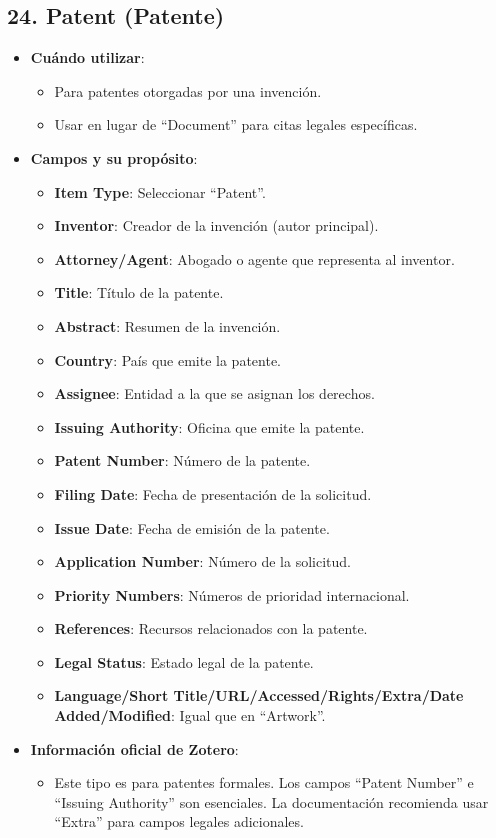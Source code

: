 \documentclass[
  jou,
  floatsintext,
  longtable,
  a4paper,
  nolmodern,
  notxfonts,
  notimes,
  colorlinks=true,linkcolor=blue,citecolor=blue,urlcolor=blue]{apa7}
\providecommand{\tightlist}{%
  \setlength{\itemsep}{0pt}\setlength{\parskip}{0pt}}
\begin{document}
\subsection{24. Patent (Patente)}\label{patent-patente}

\begin{itemize}
\tightlist
\item
  \textbf{Cuándo utilizar}:

  \begin{itemize}
  \tightlist
  \item
    Para patentes otorgadas por una invención.
  \item
    Usar en lugar de ``Document'' para citas legales específicas.
  \end{itemize}
\item
  \textbf{Campos y su propósito}:

  \begin{itemize}
  \tightlist
  \item
    \textbf{Item Type}: Seleccionar ``Patent''.
  \item
    \textbf{Inventor}: Creador de la invención (autor principal).
  \item
    \textbf{Attorney/Agent}: Abogado o agente que representa al
    inventor.
  \item
    \textbf{Title}: Título de la patente.
  \item
    \textbf{Abstract}: Resumen de la invención.
  \item
    \textbf{Country}: País que emite la patente.
  \item
    \textbf{Assignee}: Entidad a la que se asignan los derechos.
  \item
    \textbf{Issuing Authority}: Oficina que emite la patente.
  \item
    \textbf{Patent Number}: Número de la patente.
  \item
    \textbf{Filing Date}: Fecha de presentación de la solicitud.
  \item
    \textbf{Issue Date}: Fecha de emisión de la patente.
  \item
    \textbf{Application Number}: Número de la solicitud.
  \item
    \textbf{Priority Numbers}: Números de prioridad internacional.
  \item
    \textbf{References}: Recursos relacionados con la patente.
  \item
    \textbf{Legal Status}: Estado legal de la patente.
  \item
    \textbf{Language/Short Title/URL/Accessed/Rights/Extra/Date
    Added/Modified}: Igual que en ``Artwork''.
  \end{itemize}
\item
  \textbf{Información oficial de Zotero}:

  \begin{itemize}
  \tightlist
  \item
    Este tipo es para patentes formales. Los campos ``Patent Number'' e
    ``Issuing Authority'' son esenciales. La documentación recomienda
    usar ``Extra'' para campos legales adicionales.
  \end{itemize}
\end{itemize}
\end{document}
